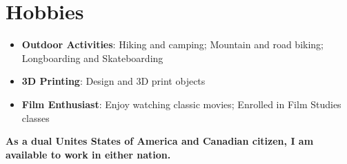 \documentclass[letterpaper,11pt]{article}
\newcommand{\resumeItem}[2]{
  \item\small{
    \textbf{#1}{#2 \vspace{-2pt}}
  }
}
\newcommand{\resumeSubItem}[2]{\resumeItem{#1}{: #2}\vspace{-4pt}}
\newcommand{\resumeSubHeadingListStart}{\begin{itemize}[leftmargin=*]}
\newcommand{\resumeSubHeadingListEnd}{\end{itemize}}
\begin{document}
\section{Hobbies}
  \resumeSubHeadingListStart
    \resumeSubItem{Outdoor Activities}{Hiking and camping; Mountain and road biking; Longboarding and Skateboarding}
    \resumeSubItem{3D Printing}{Design and 3D print objects}
    \resumeSubItem{Film Enthusiast}{Enjoy watching classic movies; Enrolled in Film Studies classes}
  \resumeSubHeadingListEnd

\vspace{5mm}
\textbf{As a dual Unites States of America and Canadian citizen, I am available to work in either nation.}
\end{document}
